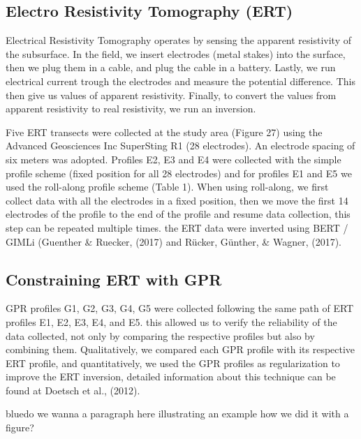 \documentclass[5p]{elsarticle}
\newcommand{\COMON}{\begin{color}{blue}}
\newcommand{\COMOFF}{\end{color}}
\begin{document}
												
												
		\subsection{Electro Resistivity Tomography (ERT)}

Electrical Resistivity Tomography operates by sensing the apparent resistivity of the subsurface. In the field, we insert electrodes (metal stakes) into the surface, then we plug them in a cable, and plug the cable in a battery. Lastly, we run electrical current trough the electrodes and measure the potential difference. This then give us values of apparent resistivity. Finally, to convert the values from apparent resistivity to real resistivity, we run an inversion.

Five ERT transects were collected at the study area (Figure 27) using the Advanced Geosciences Inc SuperSting R1 (28 electrodes). An electrode spacing of six meters was adopted. Profiles E2, E3 and E4 were collected with the simple profile scheme (fixed position for all 28 electrodes) and for profiles E1 and E5 we used the roll-along profile scheme (Table 1). When using roll-along, we first collect data with all the electrodes in a fixed position, then we move the first 14 electrodes of the profile to the end of the profile and resume data collection, this step can be repeated multiple times.
the ERT data were inverted using BERT / GIMLi (Guenther \& Ruecker, (2017) and R\"ucker, G\"unther, \& Wagner, (2017).

	
	\subsection{Constraining ERT with GPR}
										
GPR profiles G1, G2, G3, G4, G5 were collected following the same path of ERT profiles E1, E2, E3, E4, and E5. this allowed us to verify the reliability of the data collected, not only by comparing the respective profiles but also by combining them. Qualitatively, we compared each GPR profile with its respective ERT profile, and quantitatively, we used the GPR profiles as regularization to improve the ERT inversion, detailed information about this technique can be found at Doetsch et al., (2012).

\COMON do we wanna a paragraph here illustrating an example how we did it with a figure?\COMOFF
									
									
									
									
									
\end{document}

